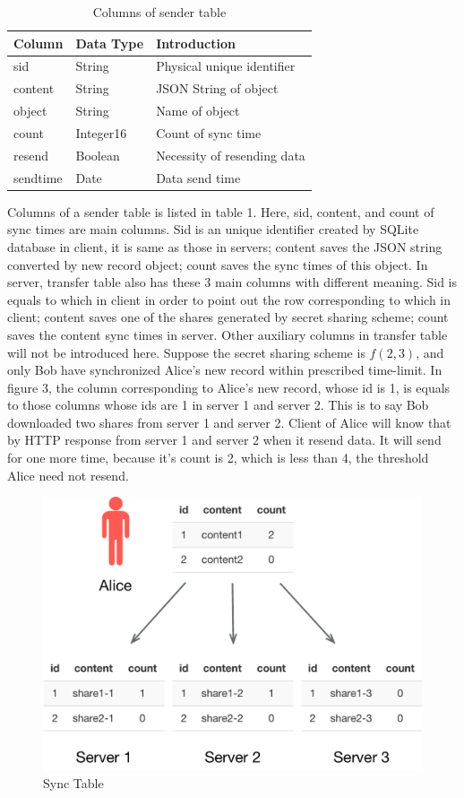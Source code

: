 \documentclass[twocolumn,10pt]{article}
\begin{document}
\begin{table}[tbp]
	\centering  
	\begin{tabular}{lll}  
		\hline
		Column &Data Type & Introduction\\ 
		\hline  
		sid &String & Physical unique identifier\\
		content & String & JSON String of object\\ 
		object & String & Name of object\\
		count & Integer16 & Count of sync time\\
		resend & Boolean &Necessity of resending data \\
		sendtime & Date & Data send time\\
		\hline
	\end{tabular}
	\caption{Columns of sender table}
\end{table}

Columns of a sender table is listed in table 1. Here, sid, content, and count of sync times are main columns. Sid is an unique identifier created by SQLite database in client, it is same as those in servers; content saves the JSON string converted by new record object; count saves the sync times of this object. In server, transfer table also has these 3 main columns with different meaning. Sid is equals to which in client in order to point out the row corresponding to which in client; content saves one of the shares generated by secret sharing scheme; count saves the content sync times in server. Other auxiliary columns in transfer table will not be introduced here.
Suppose the secret sharing scheme is $f(2, 3)$, and only Bob have synchronized Alice's new record within prescribed time-limit. In figure 3, the column corresponding to Alice's new record, whose id is 1, is equals to those columns whose ids are 1 in server 1 and server 2. This is to say Bob downloaded two shares from server 1 and server 2. Client of Alice will know that by HTTP response from server 1 and server 2 when it resend data. It will send for one more time, because it's count is 2, which is less than 4, the threshold Alice need not resend.

\begin{figure}[t]
\centering
\includegraphics[scale=0.4]{sync_table}
\caption{Sync Table}
\end{figure}
\end{document}
